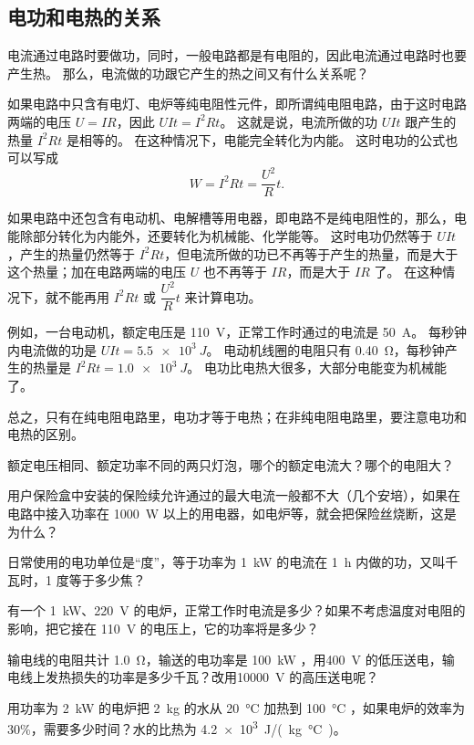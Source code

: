 \subsection{电功和电热的关系} 

电流通过电路时要做功，同时，一般电路都是有电阻的，因此电流通过电路时也要产生热。
那么，电流做的功跟它产生的热之间又有什么关系呢？

如果电路中只含有电灯、电炉等纯电阻性元件，即所谓纯电阻电路，由于这时电路两端的电压 $U=IR$，因此 $UIt=I^2Rt$。
这就是说，电流所做的功 $UIt$ 跟产生的热量 $I^2Rt$ 是相等的。
在这种情况下，电能完全转化为内能。
这时电功的公式也可以写成
\[W=I^2Rt=\frac{U^2}{R}t.\]

如果电路中还包含有电动机、电解槽等用电器，即电路不是纯电阻性的，那么，电能除部分转化为内能外，还要转化为机械能、化学能等。
这时电功仍然等于 $UIt$，产生的热量仍然等于 $I^2Rt$，但电流所做的功已不再等于产生的热量，而是大于这个热量；加在电路两端的电压 $U$ 也不再等于 $IR$，而是大于 $IR$ 了。
在这种情况下，就不能再用 $I^2Rt$ 或 $\dfrac{U^2}{R}t$ 来计算电功。

\medskip
例如，一台电动机，额定电压是 \qty{110}{V}，正常工作时通过的电流是 \qty{50}{A}。
每秒钟内电流做的功是 $UIt=\qty{5.5e3}{J}$。
电动机线圈的电阻只有 \qty{0.40}{\ohm}，每秒钟产生的热量是 $I^2Rt=\qty{1.0e3}{J}$。
电功比电热大很多，大部分电能变为机械能了。

总之，只有在纯电阻电路里，电功才等于电热；在非纯电阻电路里，要注意电功和电热的区别。

\begin{Practice}
\begin{question}
  \item 额定电压相同、额定功率不同的两只灯泡，哪个的额定电流大？哪个的电阻大？
  \item 用户保险盒中安装的保险续允许通过的最大电流一般都不大（几个安培），如果在电路中接入功率在 \qty{1000}{W} 以上的用电器，如电炉等，就会把保险丝烧断，这是为什么？
  \item 日常使用的电功单位是“度”，等于功率为 \qty{1}{kW} 的电流在 \qty{1}{h} 内做的功，又叫千瓦时，1 度等于多少焦？
  \item 有一个 \qty{1}{kW}、\qty{220}{V} 的电炉，正常工作时电流是多少？如果不考虑温度对电阻的影响，把它接在 \qty{110}{V} 的电压上，它的功率将是多少？
  \item 输电线的电阻共计 \qty{1.0}{\ohm}，输送的电功率是 \qty{100}{kW} ，用\qty{400}{V} 的低压送电，输电线上发热损失的功率是多少千瓦？改用\qty{10000}{V} 的高压送电呢？
  \item 用功率为 \qty{2}{kW} 的电炉把 \qty{2}{kg} 的水从 \qty{20}{\celsius} 加热到 \qty{100}{\celsius} ，如果电炉的效率为 30\%，需要多少时间？水的比热为 \qty{4.2e3}{J/(kg.\celsius)}。
\end{question}
\end{Practice}

